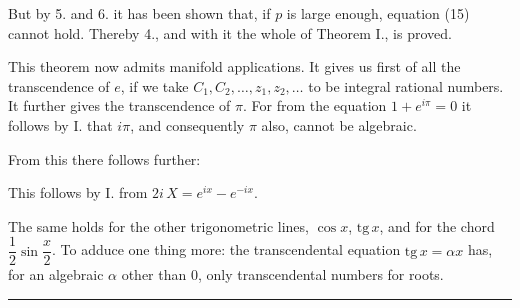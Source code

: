 But by 5. and 6. it has been shown that, if $p$ is large enough, equation (15) cannot hold. Thereby 4., and with it the whole of Theorem I., is proved.

This theorem now admits manifold applications. It gives us first of all the transcendence of $e$, if we take $C_1, C_2, \ldots, z_1, z_2, \ldots$ to be integral rational numbers. It further gives the transcendence of $\pi$. For from the equation $1+e^{i\pi}=0$ it follows by I. that $i\pi$, and consequently $\pi$ also, cannot be algebraic.

From this there follows further:




This follows by I. from $2i\,X=e^{ix}-e^{-ix}$.

The same holds for the other trigonometric lines, $\cos x$, $\mathrm{tg}\,x$, and for the chord $\dfrac{1}{2}\sin\dfrac{x}{2}$. To adduce one thing more: the transcendental equation $\mathrm{tg}\,x=\alpha x$ has, for an algebraic $\alpha$ other than 0, only transcendental numbers for roots.

\begin{center}
\rule{4cm}{0.4pt}
\end{center}
